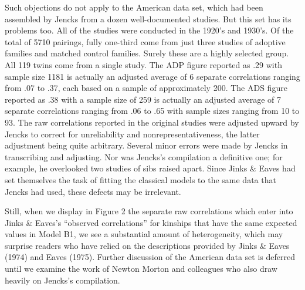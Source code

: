 ﻿\documentclass[12pt]{article}
\begin{document}
Such objections do not apply to the American data set, which had been assembled by Jencks from a dozen well-documented studies. But this set has its problems too. All of the studies were conducted in the 1920's and 1930's. Of the total of 5710 pairings, fully one-third come from just three studies of adoptive families and matched control families. Surely these are a highly selected group. All 119 twins come from a single study. The ADP figure reported as .29 with sample size 1181 is actually an adjusted average of 6 separate correlations ranging from .07 to .37, each based on a sample of approximately 200. The ADS figure reported as .38 with a sample size of 259 is actually an adjusted average of 7 separate correlations ranging from .06 to .65 with sample sizes ranging from 10 to 93. The raw correlations reported in the original studies were adjusted upward by Jencks to correct for unreliability and nonrepresentativeness, the latter adjustment being quite arbitrary. Several minor errors were made by Jencks in transcribing and adjusting. Nor was Jencks's compilation a definitive one; for example, he overlooked two studies of sibs raised apart. Since Jinks \& Eaves had set themselves the task of fitting the classical models to the same data that Jencks had used, these defects may be irrelevant.

Still, when we display in Figure 2 the separate raw correlations which enter into Jinks \& Eaves's ``observed correlations'' for kinships that have the same expected values in Model B1, we see a substantial amount of heterogeneity, which may surprise readers who have relied on the descriptions provided by Jinks \& Eaves (1974) and Eaves (1975). Further discussion of the American data set is deferred until we examine the work of Newton Morton and colleagues who also draw heavily on Jencks's compilation.

\end{document}
